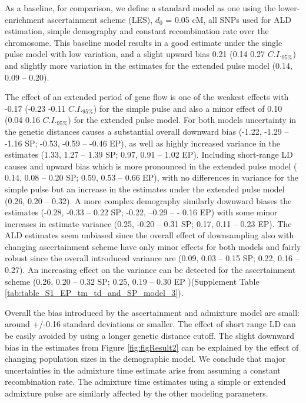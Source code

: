 \documentclass[11pt]{article}
\begin{document}
As a baseline, for comparison, we define a standard model as one using the lower-enrichment ascertainment scheme (LES), $d_{0}$ = 0.05 cM, all SNPs used for ALD estimation, simple demography and constant recombination rate over the chromosome. This baseline model results in a good estimate under the single pulse model with low variation, and a slight upward bias 0.21 (0.14 0.27 $C.I._{95\%}$) and slightly more variation in the estimates for the extended pulse model (0.14, 0.09 -- 0.20).

The effect of an extended period of gene flow is one of the weakest effects with -0.17 (-0.23 -0.11 $C.I._{95\%}$) for the simple pulse and also a minor effect of 0.10 (0.04  0.16 $C.I._{95\%}$) for the extended pulse model. For both models uncertainty in the genetic distances causes a substantial overall downward bias (-1.22, -1.29 -- -1.16 SP; -0.53, -0.59 -- -0.46 EP), as well as highly increased variance in the estimates (1.33, 1.27 -- 1.39 SP; 0.97, 0.91 -- 1.02 EP). Including short-range LD causes and upward bias which is more pronounced in the extended pulse model ( 0.14, 0.08 -- 0.20 SP; 0.59, 0.53 -- 0.66 EP), with no differences in variance for the simple pulse but an increase in the estimates under the extended pulse model (0.26, 0.20 -- 0.32). A more complex demography similarly downward biases the estimates (-0.28, -0.33 -- 0.22 SP; -0.22, --0.29 -- - 0.16 EP) with some minor increases in estimate variance (0.25, -0.20 -- 0.31 SP; 0.17, 0.11 -- 0.23 EP). The ALD estimates seem unbiased since the overall effect of downsampling also with changing ascertainment scheme have only minor effects for both models and fairly robust since the overall introduced variance are (0.09, 0.03 -- 0.15 SP; 0.22, 0.16 -- 0.27). An increasing effect on the variance can be detected for the ascertainment scheme (0.26, 0.20 -- 0.32 SP; 0.25, 0.19 -- 0.30 EP )(Supplement Table \ref{tab:table_S1_EP_tm_td_and_SP_model_3}).


Overall the bias introduced by the ascertainment and admixture model are small: around +/-0.16 standard deviations or smaller. The effect of short range LD can be easily avoided by using a longer genetic distance cutoff. The slight downward bias in the estimates from Figure \ref{fig:figResult2} can be explained by the effect of changing population sizes in the demographic model. We conclude that major uncertainties in the admixture time estimate arise from assuming a constant recombination rate. The admixture time estimates using a simple or extended admixture pulse are similarly affected by the other modeling parameters.
\end{document}
